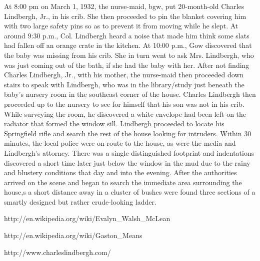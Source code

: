  At 8:00 pm on March 1, 1932, the nurse-maid, \gls{bgw}, put 20-month-old Charles Lindbergh, Jr., in his crib. 
She then proceeded to pin the blanket covering him with two large safety pins so as to prevent it from moving while he slept.
At around 9:30 p.m., Col. Lindbergh heard a noise that made him think some slats had fallen off an orange crate in the kitchen. 
At 10:00 p.m., Gow discovered that the baby was missing from his crib. She in turn went to ask Mrs. Lindbergh, who was just coming
 out of the bath, if she had the baby with her. After not finding Charles Lindbergh, Jr., with his mother, 
the nurse-maid then proceeded down stairs to speak with Lindbergh, who was in the library/study just beneath the baby's nursery room 
in the southeast corner of the house. Charles Lindbergh then proceeded up to the nursery to see for himself that his son was not in his crib. 
While surveying the room, he discovered a white envelope had been left on the radiator that formed the window sill. Lindbergh 
proceeded to locate his Springfield rifle and search the rest of the house looking for intruders. Within 30 minutes, the local 
police were on route to the house, as were the media and Lindbergh's attorney. There was a single distinguished footprint and 
indentations discovered a short time later just below the window in the mud due to the rainy and blustery conditions that day 
and into the evening. After the authorities arrived on the scene and began to search the immediate area surrounding the house,s
 a short distance away in a cluster of bushes were found three sections of a smartly designed but rather crude-looking ladder.

http://en.wikipedia.org/wiki/Evalyn\_Walsh\_McLean

http://en.wikipedia.org/wiki/Gaston\_Means

http://www.charleslindbergh.com/




